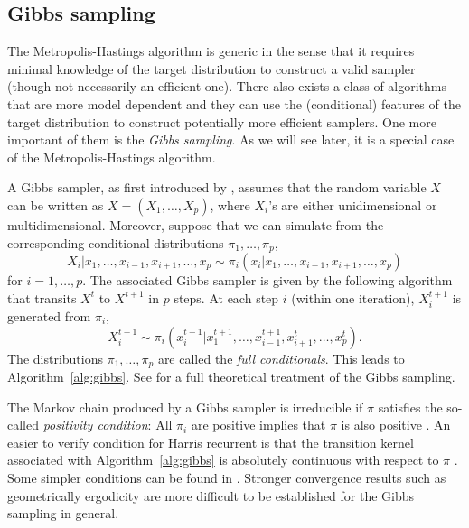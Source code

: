 \subsection{Gibbs sampling}
\label{sub:Gibbs sampling}

The Metropolis-Hastings algorithm is generic in the sense that it requires
minimal knowledge of the target distribution to construct a valid sampler
(though not necessarily an efficient one). There also exists a class of \mcmc
algorithms that are more model dependent and they can use the (conditional)
features of the target distribution to construct potentially more efficient
samplers. One more important of them is the \emph{Gibbs sampling}. As we will
see later, it is a special case of the Metropolis-Hastings algorithm.

A Gibbs sampler, as first introduced by \cite{Geman:1993bp}, assumes that the
random variable $X$ can be written as $X = (X_1,\dots,X_p)$, where $X_i$'s are
either unidimensional or multidimensional. Moreover, suppose that we can
simulate from the corresponding conditional distributions $\pi_1,\dots,\pi_p$,
\begin{equation}
  X_i|x_1,\dots,x_{i-1},x_{i+1},\dots,x_p
  \sim \pi_i(x_i|x_1,\dots,x_{i-1},x_{i+1},\dots,x_p)
\end{equation}
for $i = 1,\dots,p$. The associated Gibbs sampler is given by the following
algorithm that transits $X^t$ to $X^{t+1}$ in $p$ steps. At each step $i$
(within one iteration), $X_i^{t+1}$ is generated from $\pi_i$,
\begin{equation}
  X_i^{t+1} \sim
  \pi_i(x_i^{t+1}|x_1^{t+1},\dots,x_{i-1}^{t+1},x_{i+1}^t,\dots,x_p^t).
\end{equation}
The distributions $\pi_1,\dots,\pi_p$ are called the \emph{full conditionals}.
This leads to Algorithm~\ref{alg:gibbs}. See \cite[][chap.~8
and~9]{Robert:2004tn} for a full theoretical treatment of the Gibbs sampling.



The Markov chain produced by a Gibbs sampler is irreducible if $\pi$
satisfies the so-called \emph{positivity condition}: All $\pi_i$ are positive
implies that $\pi$ is also positive \cite[][Theorem~10.8]{Robert:2004tn}. An
easier to verify condition for Harris recurrent is that the transition kernel
associated with Algorithm~\ref{alg:gibbs} is absolutely continuous with
respect to $\pi$ \cite{Tierney:1994uk}. Some simpler conditions can be found
in \cite{Hobert:1997vx}. Stronger convergence results such as geometrically
ergodicity are more difficult to be established for the Gibbs sampling in
general.

